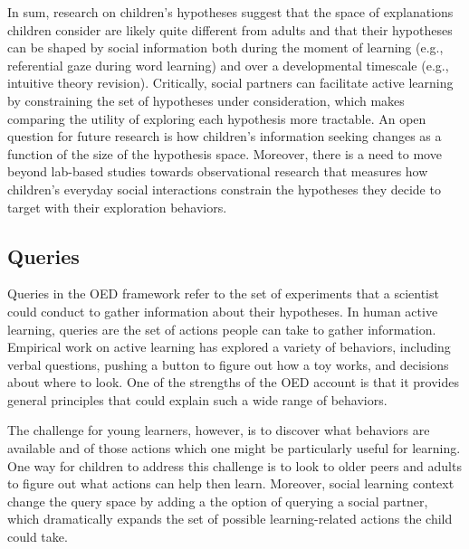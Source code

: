 \documentclass[oneside]{report}
\begin{document}
In sum, research on children's hypotheses suggest that the space of
explanations children consider are likely quite different from adults
and that their hypotheses can be shaped by social information both
during the moment of learning (e.g., referential gaze during word
learning) and over a developmental timescale (e.g., intuitive theory
revision). Critically, social partners can facilitate active learning by
constraining the set of hypotheses under consideration, which makes
comparing the utility of exploring each hypothesis more tractable. An
open question for future research is how children's information seeking
changes as a function of the size of the hypothesis space. Moreover,
there is a need to move beyond lab-based studies towards observational
research that measures how children's everyday social interactions
constrain the hypotheses they decide to target with their exploration
behaviors.

\subsection{Queries}\label{queries}

Queries in the OED framework refer to the set of experiments that a
scientist could conduct to gather information about their hypotheses. In
human active learning, queries are the set of actions people can take to
gather information. Empirical work on active learning has explored a
variety of behaviors, including verbal questions, pushing a button to
figure out how a toy works, and decisions about where to look. One of
the strengths of the OED account is that it provides general principles
that could explain such a wide range of behaviors.

The challenge for young learners, however, is to discover what behaviors
are available and of those actions which one might be particularly
useful for learning. One way for children to address this challenge is
to look to older peers and adults to figure out what actions can help
then learn. Moreover, social learning context change the query space by
adding a the option of querying a social partner, which dramatically
expands the set of possible learning-related actions the child could
take.
\end{document}
